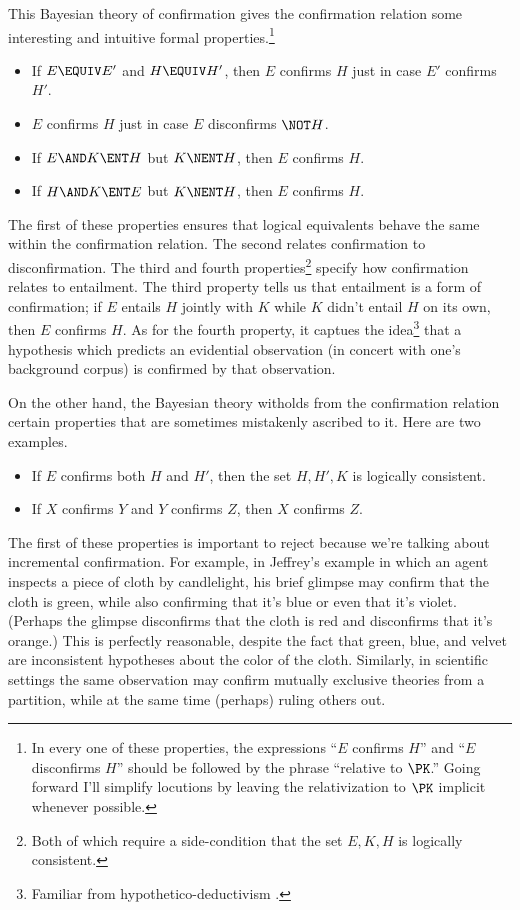 This Bayesian theory of confirmation gives the confirmation relation some interesting and intuitive formal properties.\footnote
{In every one of these properties, the expressions ``$E$ confirms $H$'' and ``$E$ disconfirms $H$'' should be followed by the phrase ``relative to $\PK$.'' Going forward I'll simplify locutions by leaving the relativization to $\PK$ implicit whenever possible.}
\begin{itemize}
\item{If $E \EQUIV E'$ and $H \EQUIV H'$, then $E$ confirms $H$ just in case $E'$ confirms $H'$.}
\item{$E$ confirms $H$ just in case $E$ disconfirms $\NOT H$.}
\item{If $E \AND K \ENT H$ but $K \NENT H$, then $E$ confirms $H$.}
\item{If $H \AND K \ENT E$ but $K \NENT H$, then $E$ confirms $H$.}
\end{itemize}
The first of these properties ensures that logical equivalents behave the same within the confirmation relation. The second relates confirmation to disconfirmation. The third and fourth properties\footnote
{Both of which require a side-condition that the set ${E, K, H}$ is logically consistent.} 
 specify how confirmation relates to entailment. The third property tells us that entailment is a form of confirmation; if $E$ entails $H$ jointly with $K$ while $K$ didn't entail $H$ on its own, then $E$ confirms $H$. As for the fourth property, it captues the idea\footnote
{Familiar from hypothetico-deductivism \citep[Section 2]{CrupiSEP}.}
 that a hypothesis which predicts an evidential observation (in concert with one's background corpus) is confirmed by that observation.
 
On the other hand, the Bayesian theory witholds from the confirmation relation certain properties that are sometimes mistakenly ascribed to it. Here are two examples.
\begin{itemize}
\item{If $E$ confirms both $H$ and $H'$, then the set ${H, H', K}$ is logically consistent.}
\item{If $X$ confirms $Y$ and $Y$ confirms $Z$, then $X$ confirms $Z$.}
\end{itemize} 
The first of these properties is important to reject because we're talking about incremental confirmation. For example, in Jeffrey's example in which an agent inspects a piece of cloth by candlelight, his brief glimpse may confirm that the cloth is green, while also confirming that it's blue or even that it's violet. (Perhaps the glimpse disconfirms that the cloth is red and disconfirms that it's orange.) This is perfectly reasonable, despite the fact that green, blue, and velvet are inconsistent hypotheses about the color of the cloth. Similarly, in scientific settings the same observation may confirm mutually exclusive theories from a partition, while at the same time (perhaps) ruling others out.

